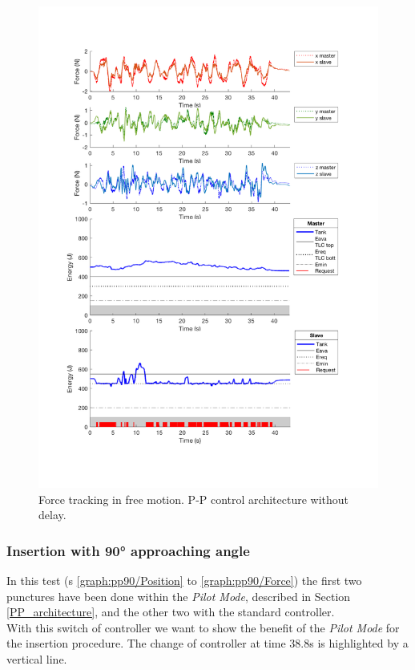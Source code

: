 \begin{center}
	\begin{figure}
	\includegraphics[width=\textwidth, keepaspectratio]{plots/ppFree/Force.pdf}
	\caption{Force tracking in free motion. P-P control architecture without delay.}
	\label{graph:ppFree/Force}
\end{figure}
\end{center}
\newpage
\subsubsection{Insertion with 90° approaching angle}\label{sec:insertion-with-90-approaching-angle}
In this test  (\figurename s{ \ref{graph:pp90/Position} to \ref{graph:pp90/Force}}) the first two punctures have been done within the \textit{Pilot Mode}, described in Section \ref{PP_architecture}, and the other two with the standard controller.\\
With this switch of controller we want to show the benefit of the \textit{Pilot Mode} for the insertion procedure.
The change of controller at time 38.8s is highlighted by a vertical line.

